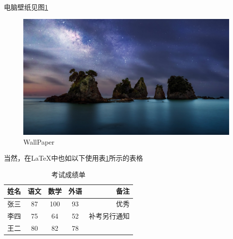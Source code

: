 \documentclass{ctexart}%
\begin{document}
  	电脑壁纸见图\ref{fig-wallpaper}%
  	\begin{figure}[htbp]%
  		\centering %
  		\includegraphics[scale=0.25]{wallpaper}%
  		\caption{WallPaper}\label{fig-wallpaper} %
  	\end{figure}
  	
  	当然，在\LaTeX{}中也如以下使用表\ref{tab-score}所示的表格
  	\begin{table}[h]
  		\centering
  		\caption{考试成绩单}\label{tab-score}
  		\begin{tabular}{|l|c|c|c|r|}
  			\hline %
  			姓名 & 语文 & 数学 & 外语 & 备注 \\
  			\hline %
  			张三 & 87 & 100 & 93 & 优秀 \\
  			\hline %
  			李四 & 75 & 64 & 52 & 补考另行通知 \\
  			\hline %
  			王二 & 80 & 82 & 78 & \\ 
  			\hline %
  		\end{tabular}
  	\end{table}
  	
\end{document}
